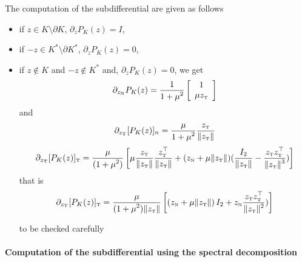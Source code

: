The computation of the subdifferential are given as follows
\begin{itemize}
\item if $z\in K\setminus \partial K$, $\partial_z P_K(z) =I$,
\item if $-z \in K^*\setminus \partial K^*$, $\partial_z P_K(z) =0$,
\item if $z \notin K$ and $-z \notin K^*$ and, $\partial_z P_K(z) =0$, we get
\begin{equation}
  \label{eq:sub-proj_n}
  \partial_{z_\n} P_{K}(z) =
  \Frac 1 {1+\mu^2}
  \left[
    \begin{array}{c}
      1 \\
      \mu z_\t
    \end{array}\right] 
\end{equation}
and
\begin{equation}
  \label{eq:sub-proj_t1}
  \partial_{z_\t} [P_{K}(z)]_\n =
  \Frac \mu {1+\mu^2} \Frac {z_\t} {\|z_\t\|}
\end{equation}
\begin{equation}
  \label{eq:sub-proj_2}
  \partial_{z_\t} [P_{K}(z)]_\t =
  \Frac {\mu} {(1+\mu^2)} \left[\mu \Frac {z_\t} {\|z_\t\|} \Frac {z^\top_\t} {\|z_\t\|}+ (z_\n + \mu \|z_\t\|) (\Frac{I_2}{\|z_\t\|} - \Frac{z_\t z_\t^\top}{\|z_\t\|^3} )\right]
\end{equation}
that is
\begin{equation}
  \label{eq:sub-proj_2_bis}
  \partial_{z_\t} [P_{K}(z)]_\t =
  \Frac {\mu} {(1+\mu^2)\|z_\t\|} \left[ (z_\n + \mu \|z_\t\|) \,I_2   +  z_\n  \Frac{z_\t z_\t^\top}{\|z_\t\|^2} )\right]
\end{equation}
\begin{ndrva}
  to be checked carefully
\end{ndrva}

\end{itemize}


\paragraph{Computation of the subdifferential using the spectral decomposition}



